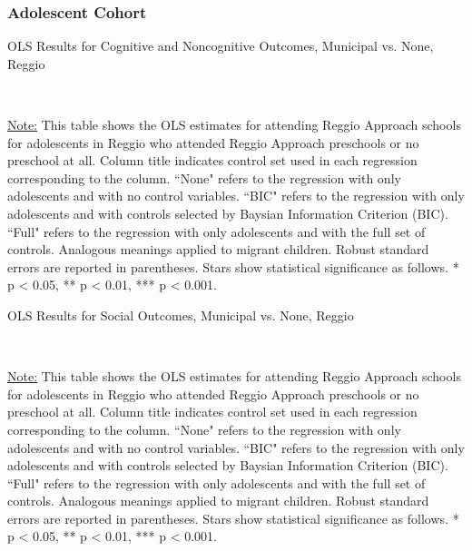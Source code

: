 \subsubsection{Adolescent Cohort}
\begin{table}[H] \caption{OLS Results for Cognitive and Noncognitive Outcomes, Municipal vs. None, Reggio} \label{ols-CN-adol-reg}
\scalebox{0.85}{
}
\vspace{1ex} \\
\footnotesize\raggedright{\underline{Note:} This table shows the OLS estimates for attending Reggio Approach schools for adolescents in Reggio who attended Reggio Approach preschools or no preschool at all. Column title indicates control set used in each regression corresponding to the column. ``None" refers to the regression with only adolescents and with no control variables. ``BIC" refers to the regression with only adolescents and with controls selected by Baysian Information Criterion (BIC). ``Full" refers to the regression with only adolescents and with the full set of controls. Analogous meanings applied to migrant children. Robust standard errors are reported in parentheses. Stars show statistical significance as follows. * p < 0.05, ** p < 0.01, *** p < 0.001.}
\end{table}

\begin{table}[H] \caption{OLS Results for Social Outcomes, Municipal vs. None, Reggio} \label{ols-S-adol-reg}

\vspace{1ex} \\
\footnotesize\raggedright{\underline{Note:} This table shows the OLS estimates for attending Reggio Approach schools for adolescents in Reggio who attended Reggio Approach preschools or no preschool at all. Column title indicates control set used in each regression corresponding to the column. ``None" refers to the regression with only adolescents and with no control variables. ``BIC" refers to the regression with only adolescents and with controls selected by Baysian Information Criterion (BIC). ``Full" refers to the regression with only adolescents and with the full set of controls. Analogous meanings applied to migrant children. Robust standard errors are reported in parentheses. Stars show statistical significance as follows. * p < 0.05, ** p < 0.01, *** p < 0.001.}
\end{table}

